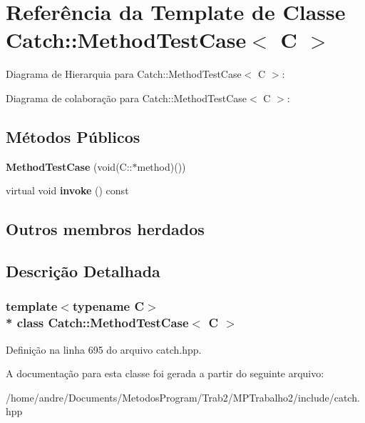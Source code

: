 \hypertarget{classCatch_1_1MethodTestCase}{}\section{Referência da Template de Classe Catch\+:\+:Method\+Test\+Case$<$ C $>$}
\label{classCatch_1_1MethodTestCase}


Diagrama de Hierarquia para Catch\+:\+:Method\+Test\+Case$<$ C $>$\+:


Diagrama de colaboração para Catch\+:\+:Method\+Test\+Case$<$ C $>$\+:
\subsection*{Métodos Públicos}
\begin{DoxyCompactItemize}
\item 
{\bfseries Method\+Test\+Case} (void(C\+::$\ast$method)())\hypertarget{classCatch_1_1MethodTestCase_a7b043b85dae371358255dd9dc6582e7b}{}\label{classCatch_1_1MethodTestCase_a7b043b85dae371358255dd9dc6582e7b}

\item 
virtual void {\bfseries invoke} () const \hypertarget{classCatch_1_1MethodTestCase_a39cc4b760dd71adc3f7550bc1e7eb697}{}\label{classCatch_1_1MethodTestCase_a39cc4b760dd71adc3f7550bc1e7eb697}

\end{DoxyCompactItemize}
\subsection*{Outros membros herdados}


\subsection{Descrição Detalhada}
\subsubsection*{template$<$typename C$>$\\*
class Catch\+::\+Method\+Test\+Case$<$ C $>$}



Definição na linha 695 do arquivo catch.\+hpp.



A documentação para esta classe foi gerada a partir do seguinte arquivo\+:\begin{DoxyCompactItemize}
\item 
/home/andre/\+Documents/\+Metodos\+Program/\+Trab2/\+M\+P\+Trabalho2/include/catch.\+hpp\end{DoxyCompactItemize}
